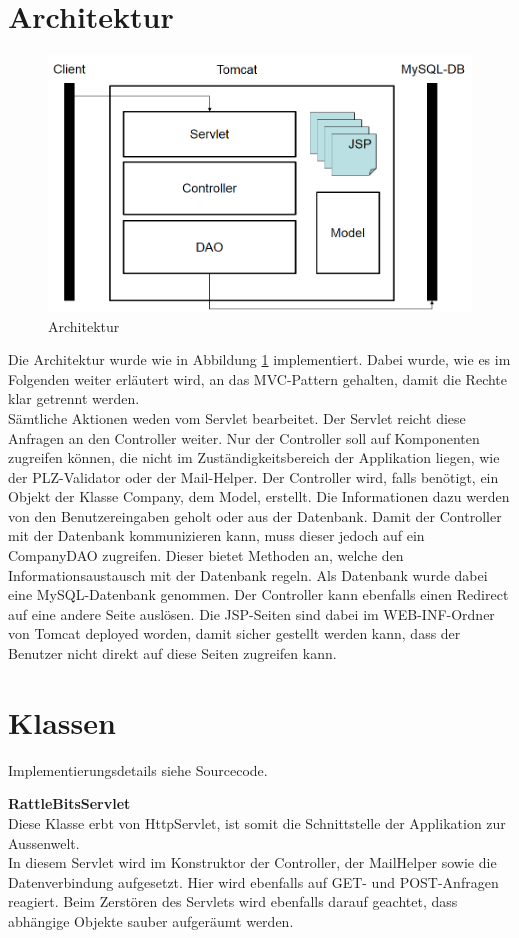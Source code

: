 \documentclass[12pt]{scrartcl}
\begin{document}
\section{Architektur}
\begin{figure}
	\centering
	\includegraphics[width=12cm]{./Architektur.png}
	\caption{Architektur}
	\label{fig:Arch}
\end{figure}
Die Architektur wurde wie in Abbildung \ref{fig:Arch} implementiert. Dabei wurde, wie es im Folgenden weiter erläutert wird, an das MVC-Pattern gehalten, damit die Rechte klar getrennt werden.\\
Sämtliche Aktionen weden vom Servlet bearbeitet. Der Servlet reicht diese Anfragen an den Controller weiter. Nur der Controller soll auf Komponenten zugreifen können, die nicht im Zuständigkeitsbereich der Applikation liegen, wie der PLZ-Validator oder der Mail-Helper. Der Controller wird, falls benötigt, ein Objekt der Klasse Company, dem Model, erstellt. Die Informationen dazu werden von den Benutzereingaben geholt oder aus der Datenbank. Damit der Controller mit der Datenbank kommunizieren kann, muss dieser jedoch auf ein CompanyDAO zugreifen. Dieser bietet Methoden an, welche den Informationsaustausch mit der Datenbank regeln. Als Datenbank wurde dabei eine MySQL-Datenbank genommen. 
Der Controller kann ebenfalls einen Redirect auf eine andere Seite auslösen. Die JSP-Seiten sind dabei im WEB-INF-Ordner von Tomcat deployed worden, damit sicher gestellt werden kann, dass der Benutzer nicht direkt auf diese Seiten zugreifen kann.

\section{Klassen}
Implementierungsdetails siehe Sourcecode.

\textbf{RattleBitsServlet}\\
Diese Klasse erbt von HttpServlet, ist somit die Schnittstelle der Applikation zur Aussenwelt.\\
In diesem Servlet wird im Konstruktor der Controller, der MailHelper sowie die Datenverbindung aufgesetzt. Hier wird ebenfalls auf GET- und POST-Anfragen reagiert. Beim Zerstören des Servlets wird ebenfalls darauf geachtet, dass abhängige Objekte sauber aufgeräumt werden.\\
\end{document}
